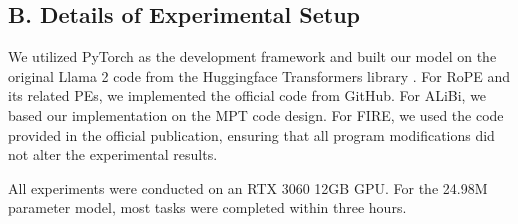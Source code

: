 \documentclass[letterpaper]{article} %
\begin{document}
\subsection{B. Details of Experimental Setup}
We utilized PyTorch \cite{paszke-2017-torch} as the development framework and built our model on the original Llama 2 code from the Huggingface Transformers library \cite{wolf-2020-transformers}. For RoPE and its related PEs, we implemented the official code from GitHub. For ALiBi, we based our implementation on the MPT \cite{MosaicML-2023-Introducing} code design. For FIRE, we used the code provided in the official publication, ensuring that all program modifications did not alter the experimental results.

All experiments were conducted on an RTX 3060 12GB GPU. For the 24.98M parameter model, most tasks were completed within three hours.
\end{document}
